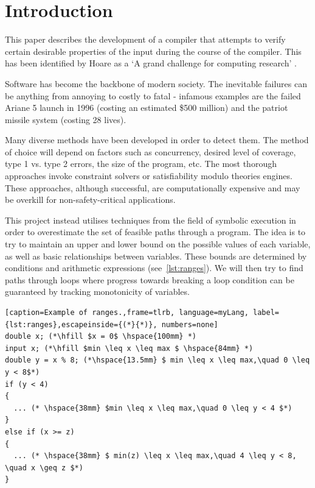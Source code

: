\documentclass[12pt,a4paper]{article}
\begin{document}
\section{Introduction}
This paper describes the development of a compiler that attempts to verify certain desirable properties of the input during the course of the compiler.
This has been identified by Hoare as a `A grand challenge for computing research' \citep{hoare}.

Software has become the backbone of modern society.
The inevitable failures can be anything from annoying to costly to fatal - infamous examples are the failed Ariane 5 launch in 1996
(costing an estimated \$500 million) and the patriot missile system (costing 28 lives).

Many diverse methods have been developed in order to detect them. The method of choice will depend on factors such as concurrency,
desired level of coverage, type 1 vs. type 2 errors, the size of the program, etc. The most thorough approaches invoke constraint solvers or satisfiability modulo theories engines. These approaches, although successful, are computationally expensive and may be overkill for non-safety-critical applications.

This project instead utilises techniques from the field of symbolic execution in order to overestimate the set of feasible paths through a program.
The idea is to try to maintain an upper and lower bound on the possible values of each variable, as well as basic relationships between variables.
These bounds are determined by conditions and arithmetic expressions (see~\cref{lst:ranges}).
We will then try to find paths through loops where progress towards breaking a loop condition can be guaranteed by tracking monotonicity of variables.

\begin{minipage}{\linewidth}
\begin{lstlisting}[caption=Example of ranges.,frame=tlrb, language=myLang, label={lst:ranges},escapeinside={(*}{*)}, numbers=none]
double x; (*\hfill $x = 0$ \hspace{100mm} *)
input x; (*\hfill $min \leq x \leq max $ \hspace{84mm} *)
double y = x % 8; (*\hspace{13.5mm} $ min \leq x \leq max,\quad 0 \leq y < 8$*)
if (y < 4)
{
  ... (* \hspace{38mm} $min \leq x \leq max,\quad 0 \leq y < 4 $*)
}
else if (x >= z)
{
  ... (* \hspace{38mm} $ min(z) \leq x \leq max,\quad 4 \leq y < 8, \quad x \geq z $*) 
}
\end{lstlisting}
\end{minipage}
\end{document}
